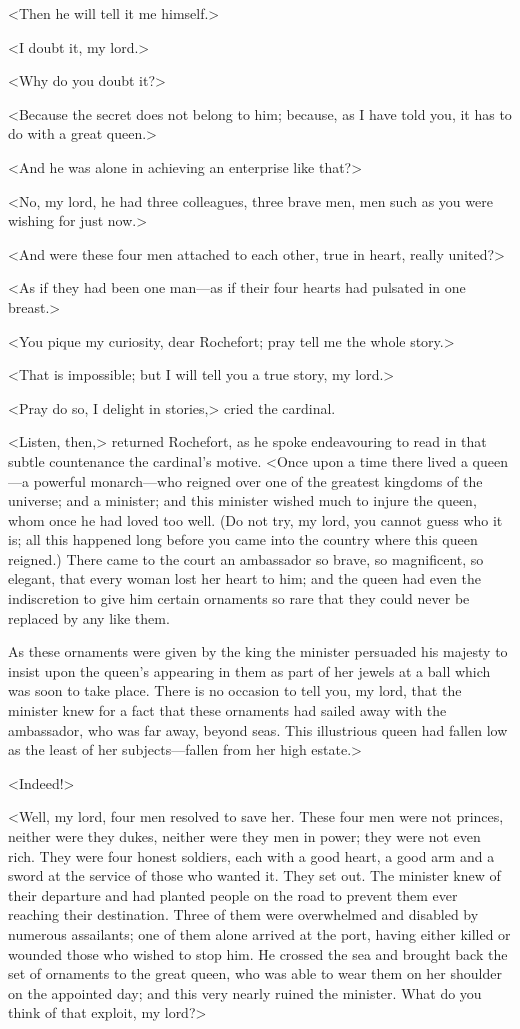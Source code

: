 <Then he will tell it me himself.>

<I doubt it, my lord.>

<Why do you doubt it?>

<Because the secret does not belong to him; because, as I have told you, it has to do with a great queen.>

<And he was alone in achieving an enterprise like that?>

<No, my lord, he had three colleagues, three brave men, men such as you were wishing for just now.>

<And were these four men attached to each other, true in heart, really united?>

<As if they had been one man—as if their four hearts had pulsated in one breast.>

<You pique my curiosity, dear Rochefort; pray tell me the whole story.>

<That is impossible; but I will tell you a true story, my lord.>

<Pray do so, I delight in stories,> cried the cardinal.

<Listen, then,> returned Rochefort, as he spoke endeavouring to read in that subtle countenance the cardinal's motive. <Once upon a time there lived a queen—a powerful monarch—who reigned over one of the greatest kingdoms of the universe; and a minister; and this minister wished much to injure the queen, whom once he had loved too well. (Do not try, my lord, you cannot guess who it is; all this happened long before you came into the country where this queen reigned.) There came to the court an ambassador so brave, so magnificent, so elegant, that every woman lost her heart to him; and the queen had even the indiscretion to give him certain ornaments so rare that they could never be replaced by any like them.

As these ornaments were given by the king the minister persuaded his majesty to insist upon the queen's appearing in them as part of her jewels at a ball which was soon to take place. There is no occasion to tell you, my lord, that the minister knew for a fact that these ornaments had sailed away with the ambassador, who was far away, beyond seas. This illustrious queen had fallen low as the least of her subjects—fallen from her high estate.>

<Indeed!>

<Well, my lord, four men resolved to save her. These four men were not princes, neither were they dukes, neither were they men in power; they were not even rich. They were four honest soldiers, each with a good heart, a good arm and a sword at the service of those who wanted it. They set out. The minister knew of their departure and had planted people on the road to prevent them ever reaching their destination. Three of them were overwhelmed and disabled by numerous assailants; one of them alone arrived at the port, having either killed or wounded those who wished to stop him. He crossed the sea and brought back the set of ornaments to the great queen, who was able to wear them on her shoulder on the appointed day; and this very nearly ruined the minister. What do you think of that exploit, my lord?>

